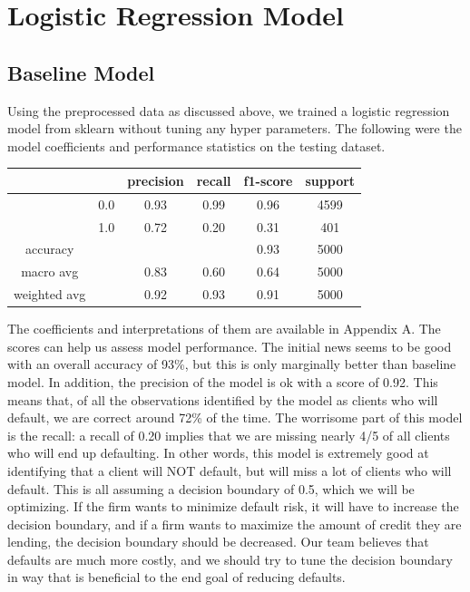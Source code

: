 \documentclass[12pt]{article}
\begin{document}
	\section{Logistic Regression Model}
	
	\subsection{Baseline Model}
	
	Using the preprocessed data as discussed above, we trained a logistic regression model from sklearn without tuning any hyper parameters. 
	The following were the model coefficients and performance statistics on the testing dataset. 
	

	\begin{tabular}{c|c|c|c|c|c}
	\hline
			& 		& 	precision &  recall  & f1-score   & support \\ \hline
			
			&  0.0	  &		0.93 &     0.99   &  0.96    &  4599 \\ \hline
			&  1.0    &		0.72 &     0.20   &   0.31   &    401 \\ \hline
			
			accuracy & & & &                       					0.93     & 5000 \\ \hline
			macro avg  & &   				0.83   &   0.60  &    0.64  &    5000  \\ \hline
			weighted avg  & &   			0.92   &   0.93  &    0.91   &   5000 \\ \hline
	\end{tabular}					

	The coefficients and interpretations of them are available in Appendix A. The scores can help us assess model performance. The initial news seems to be good with an overall accuracy of 93\%, but this is only marginally better than baseline model. In addition, the precision of the model is ok with a score of 0.92. This means that, of all the observations identified by the model as clients who will default, we are correct around 72\% of the time. The worrisome part of this model is the recall: a recall of 0.20 implies that we are missing nearly 4/5 of all clients who will end up defaulting. In other words, this model is extremely good at identifying that a client will NOT default, but will miss a lot of clients who will default. This is all assuming a decision boundary of 0.5, which we will be optimizing. If the firm wants to minimize default risk, it will have to increase the decision boundary, and if a firm wants to maximize the amount of credit they are lending, the decision boundary should be decreased. Our team believes that defaults are much more costly, and we should try to tune the decision boundary in  way that is beneficial to the end goal of reducing defaults. 
	
\end{document}
